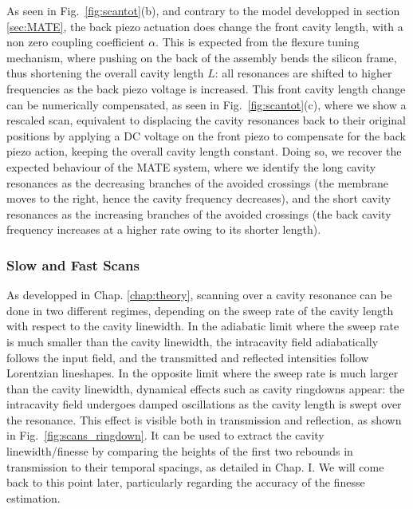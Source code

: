 As seen in Fig.~\ref{fig:scantot}(b), and contrary to the model developped in section \ref{sec:MATE}, the back piezo actuation does change the front cavity length, with a non zero coupling coefficient $\alpha$. This is expected from the flexure tuning mechanism, where pushing on the back of the assembly bends the silicon frame, thus shortening the overall cavity length $L$: all resonances are shifted to higher frequencies as the back piezo voltage is increased. This front cavity length change can be numerically compensated, as seen in Fig.~\ref{fig:scantot}(c), where we show a rescaled scan, equivalent to displacing the cavity resonances back to their original positions by applying a DC voltage on the front piezo to compensate for the back piezo action, keeping the overall cavity length constant. Doing so, we recover the expected behaviour of the MATE system, where we identify the long cavity resonances as the decreasing branches of the avoided crossings (the membrane moves to the right, hence the cavity frequency decreases), and the short cavity resonances as the increasing branches of the avoided crossings (the back cavity frequency increases at a higher rate owing to its shorter length). 


\subsubsection{Slow and Fast Scans}
As developped in Chap. \ref{chap:theory}, scanning over a cavity resonance can be done in two different regimes, depending on the sweep rate of the cavity length with respect to the cavity linewidth. In the adiabatic limit where the sweep rate is much smaller than the cavity linewidth, the intracavity field adiabatically follows the input field, and the transmitted and reflected intensities follow Lorentzian lineshapes. In the opposite limit where the sweep rate is much larger than the cavity linewidth, dynamical effects such as cavity ringdowns appear: the intracavity field undergoes damped oscillations as the cavity length is swept over the resonance. This effect is visible both in transmission and reflection, as shown in Fig.~\ref{fig:scans_ringdown}. It can be used to extract the cavity linewidth/finesse by comparing the heights of the first two rebounds in transmission to their temporal spacings, as detailed in Chap. I. We will come back to this point later, particularly regarding the accuracy of the finesse estimation. \\ 


